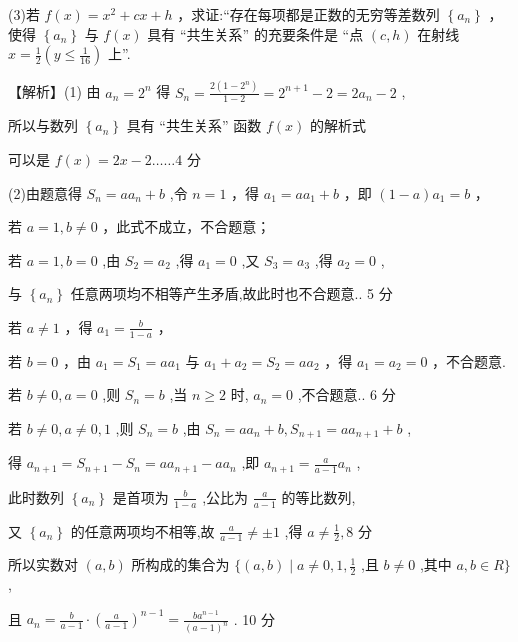 \documentclass[10pt]{article}
\newcommand*\circled[1]{\tikz[baseline=(char.base)]{\node[shape=circle,draw,inner sep=1.5pt] (char) {\small #1};}}
\begin{document}
(3)若 \(f\left( x\right)  = {x}^{2} + {cx} + h\) ，求证:“存在每项都是正数的无穷等差数列 \(\left\{  {a}_{n}\right\}\) ，使得 \(\left\{  {a}_{n}\right\}\) 与 \(f\left( x\right)\) 具有 “共生关系” 的充要条件是 “点 \(\left( {c,h}\right)\) 在射线 \(x = \frac{1}{2}\left( {y \leq  \frac{1}{16}}\right)\) 上”.

【解析】(1) 由 \({a}_{n} = {2}^{n}\) 得 \({S}_{n} = \frac{2\left( {1 - {2}^{n}}\right) }{1 - 2} = {2}^{n + 1} - 2 = 2{a}_{n} - 2\) ,

所以与数列 \(\left\{  {a}_{n}\right\}\) 具有 “共生关系” 函数 \(f\left( x\right)\) 的解析式

可以是 \(f\left( x\right)  = {2x} - 2\ldots \ldots 4\) 分

(2)由题意得 \({S}_{n} = a{a}_{n} + b\) ,令 \(n = 1\) ，得 \({a}_{1} = a{a}_{1} + b\) ，即 \(\left( {1 - a}\right) {a}_{1} = b\) ，

 \circled{1} 若 \(a = 1,b \neq  0\) ，此式不成立，不合题意；

若 \(a = 1,b = 0\) ,由 \({S}_{2} = {a}_{2}\) ,得 \({a}_{1} = 0\) ,又 \({S}_{3} = {a}_{3}\) ,得 \({a}_{2} = 0\) ,

与 \(\left\{  {a}_{n}\right\}\) 任意两项均不相等产生矛盾,故此时也不合题意.. 5 分

 \circled{2}  若 \(a \neq  1\) ，得 \({a}_{1} = \frac{b}{1 - a}\) ，

若 \(b = 0\) ，由 \({a}_{1} = {S}_{1} = a{a}_{1}\) 与 \({a}_{1} + {a}_{2} = {S}_{2} = a{a}_{2}\) ，得 \({a}_{1} = {a}_{2} = 0\) ，不合题意.

若 \(b \neq  0,a = 0\) ,则 \({S}_{n} = b\) ,当 \(n \geq  2\) 时, \({a}_{n} = 0\) ,不合题意.. 6 分

若 \(b \neq  0,a \neq  0,1\) ,则 \({S}_{n} = b\) ,由 \({S}_{n} = a{a}_{n} + b,{S}_{n + 1} = a{a}_{n + 1} + b\) ,

得 \({a}_{n + 1} = {S}_{n + 1} - {S}_{n} = a{a}_{n + 1} - a{a}_{n}\) ,即 \({a}_{n + 1} = \frac{a}{a - 1}{a}_{n}\) ,

此时数列 \(\left\{  {a}_{n}\right\}\) 是首项为 \(\frac{b}{1 - a}\) ,公比为 \(\frac{a}{a - 1}\) 的等比数列,

又 \(\left\{  {a}_{n}\right\}\) 的任意两项均不相等,故 \(\frac{a}{a - 1} \neq   \pm  1\) ,得 \(a \neq  \frac{1}{2},8\) 分

所以实数对 \(\left( {a,b}\right)\) 所构成的集合为 \(\{ \left( {a,b}\right)  \mid  a \neq  0,1,\frac{1}{2}\) ,且 \(b \neq  0\) ,其中 \(a,b \in  R\}\) ,

且 \({a}_{n} = \frac{b}{a - 1} \cdot  {\left( \frac{a}{a - 1}\right) }^{n - 1} = \frac{b{a}^{n - 1}}{{\left( a - 1\right) }^{n}}\) . 10 分
\end{document}
